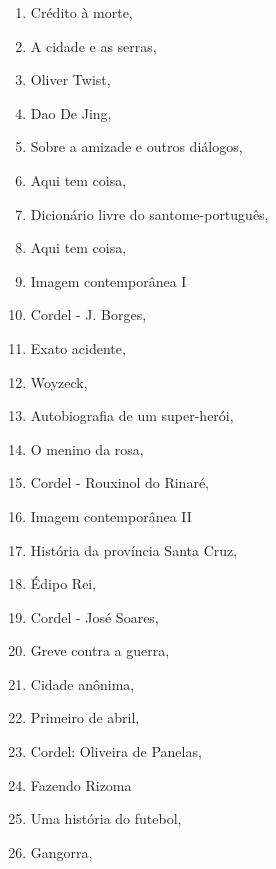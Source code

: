 \begin{multicols}{2}
\begin{enumerate}
\item Crédito à morte, {}
\item A cidade e as serras, {}
\item Oliver Twist, {}
\item Dao De Jing, {}
\item Sobre a amizade e outros diálogos, {}
\item Aqui tem coisa, {}
\item Dicionário livre do santome-português, {}
\item Aqui tem coisa, {}
\item Imagem contemporânea I
\item Cordel - J. Borges, {}
\item Exato acidente, {}
\item Woyzeck, {}
\item Autobiografia de um super-herói, {}
\item O menino da rosa, {}
\item Cordel - Rouxinol do Rinaré, {}
\item Imagem contemporânea II
\item História da província Santa Cruz, {}
\item Édipo Rei, {}
\item Cordel - José Soares, {}
\item Greve contra a guerra, {}
\item Cidade anônima, {}
\item Primeiro de abril, {}
\item Cordel: Oliveira de Panelas, {}
\item Fazendo Rizoma
\item Uma história do futebol, {}
\item Gangorra, {}

\end{enumerate}
\end{multicols}
